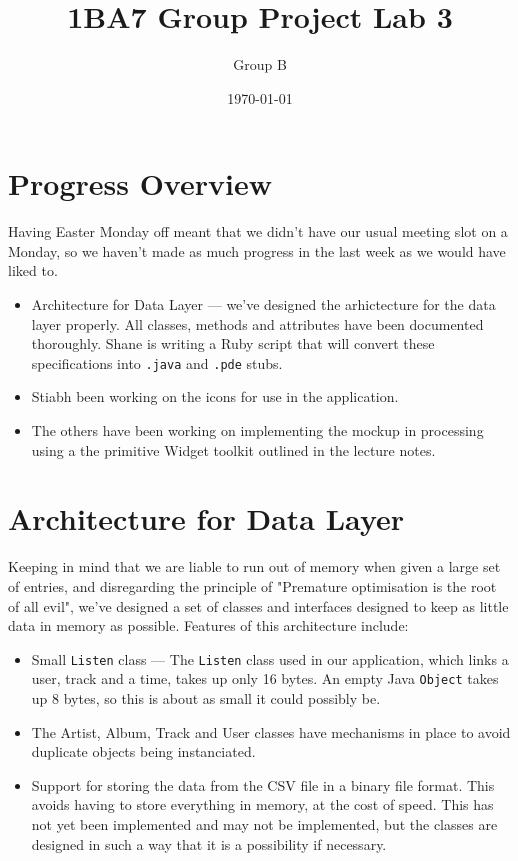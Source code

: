 \documentclass[titlepage,a4paper]{article}
\begin{document}
\title{1BA7 Group Project Lab 3}
\author{Group B}
\date{\today}
\maketitle
\newcommand{\mono}[1]{\texttt{#1}}
\newcommand{\code}[1]{\texttt{#1}}

\section{Progress Overview}
Having Easter Monday off meant that we didn't have our usual meeting slot on
a Monday, so we haven't made as much progress in the last week as we would have
liked to.
\begin{itemize}
\item Architecture for Data Layer --- we've designed the arhictecture for the
data layer properly. All classes, methods and attributes have been documented
thoroughly. Shane is writing a Ruby script that will convert these
specifications into \code{.java} and \code{.pde} stubs.
\item Stiabh been working on the icons for use in the application.
\item The others have been working on implementing the mockup in processing
using a the primitive Widget toolkit outlined in the lecture notes.
\end{itemize}

\section{Architecture for Data Layer}
Keeping in mind that we are liable to run out of memory when given a large
set of entries, and disregarding the principle of "Premature optimisation is
the root of all evil", we've designed a set of classes and interfaces designed 
to keep as little data in memory as possible. Features of this architecture
include:
\begin{itemize}
\item Small \code{Listen} class --- The \mono{Listen} class used in our
application, which links a user, track and a time, takes up only 16 bytes. An
empty Java \mono{Object} takes up 8 bytes, so this is about as small it could
possibly be. 
\item The Artist, Album, Track and User classes have mechanisms in place to
avoid duplicate objects being instanciated.
\item Support for storing the data from the CSV file in a binary file format.
This avoids having to store everything in memory, at the cost of speed. This has
not yet been implemented and may not be implemented, but the classes are designed
in such a way that it is a possibility if necessary.
\end{itemize}
\end{document}
